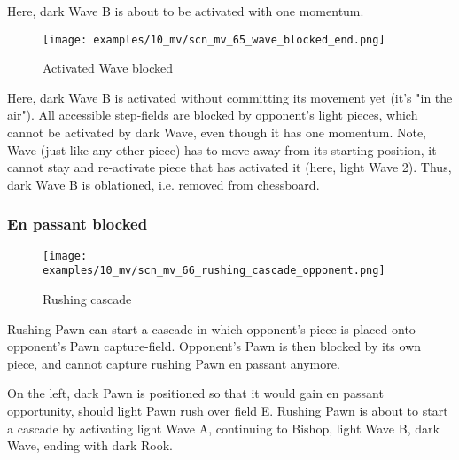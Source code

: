 Here, dark Wave B is about to be activated with one momentum.

\clearpage %

\vspace*{-2.1\baselineskip}
\noindent
\begin{figure}[h]
\texttt{[image: examples/10\_mv/scn\_mv\_65\_wave\_blocked\_end.png]}
\caption{Activated Wave blocked}
\label{fig:scn_mv_65_wave_blocked_end}
\end{figure}

Here, dark Wave B is activated without committing its movement yet (it's "in the air").
All accessible step-fields are blocked by opponent's light pieces, which cannot be
activated by dark Wave, even though it has one momentum.
Note, Wave (just like any other piece) has to move away from its starting position,
it cannot stay and re-activate piece that has activated it (here, light Wave 2).
Thus, dark Wave B is oblationed, i.e. removed from chessboard.

\clearpage %

\subsubsection*{En passant blocked}
\label{sec:Miranda's veil/Wave/Cascading opponent/En passant blocked}

\vspace*{-0.7\baselineskip}
\noindent
\begin{wrapfigure}[15]{l}{0.4\textwidth}
\centering
\texttt{[image: examples/10\_mv/scn\_mv\_66\_rushing\_cascade\_opponent.png]}
\vspace*{-1.4\baselineskip}
\caption{Rushing cascade}
\label{fig:scn_mv_66_rushing_cascade_opponent}
\end{wrapfigure}
Rushing Pawn can start a cascade in which opponent's piece is placed onto opponent's
Pawn capture-field.
Opponent's Pawn is then blocked by its own piece, and cannot capture rushing Pawn en
passant anymore.

On the left, dark Pawn is positioned so that it would gain en passant opportunity,
should light Pawn rush over field E. Rushing Pawn is about to start a cascade by
activating light Wave A, continuing to Bishop, light Wave B, dark Wave, ending
with dark Rook.

